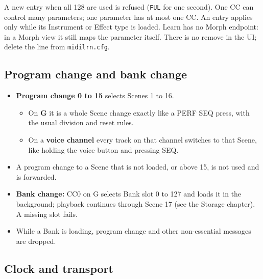 A new entry when all 128 are used is refused (\texttt{FUL} for one
second). One CC can control many parameters; one parameter has at most
one CC. An entry applies only while its Instrument or Effect type is
loaded. Learn has no Morph endpoint: in a Morph view it still maps the
parameter itself. There is no remove in the UI; delete the line from
\texttt{midilrn.cfg}.


\subsection{Program change and bank
change}\label{program-change-and-bank-change}

\begin{itemize}
\tightlist
\item
  \textbf{Program change 0 to 15} selects Scenes 1 to 16.

  \begin{itemize}
  \tightlist
  \item
    On \textbf{G} it is a whole Scene change exactly like a PERF SEQ
    press, with the usual division and reset rules.
  \item
    On a \textbf{voice channel} every track on that channel switches to
    that Scene, like holding the voice button and pressing SEQ.
  \end{itemize}
\item
  A program change to a Scene that is not loaded, or above 15, is not
  used and is forwarded.
\item
  \textbf{Bank change:} CC0 on G selects Bank slot 0 to 127 and loads it
  in the background; playback continues through Scene 17 (see the
  Storage chapter). A missing slot fails.
\item
  While a Bank is loading, program change and other non-essential
  messages are dropped.
\end{itemize}

\subsection{Clock and transport}\label{clock-and-transport}

